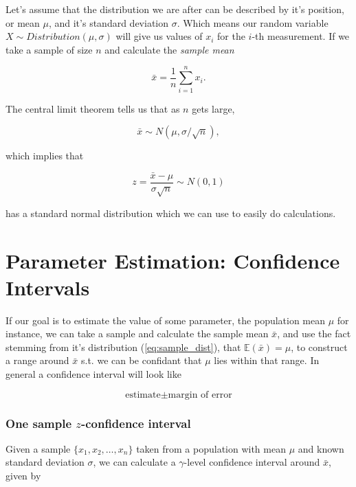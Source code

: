 \documentclass{article}
\newcommand{\xbar}{\bar x}
\begin{document}
Let's assume that the distribution we are after can be described by it's position, or mean $\mu$, and it's standard deviation $\sigma$.  Which means our random variable $X \sim Distribution(\mu, \sigma)$ will give us values of $x_i$ for the $i$-th measurement.  If we take a sample of size $n$ and calculate the \textit{sample mean}

\begin{equation}
\xbar = \frac{1}{n} \sum_{i=1}^n x_i.
\end{equation}

\noindent
The central limit theorem tells us that as $n$ gets large, 

\begin{equation}
\label{eq:sample_dist}
\xbar \sim N(\mu, \sigma / \sqrt{n}), 
\end{equation}


\noindent
which implies that

\begin{equation}
z = \frac{\xbar - \mu}{\sigma \sqrt{n}} \sim N(0,1)
\end{equation}

\noindent
has a standard normal distribution which we can use to easily do calculations.



\newpage
\section{Parameter Estimation: Confidence Intervals}

If our goal is to estimate the value of some parameter, the population mean $\mu$ for instance, we can take a sample and calculate the sample mean $\xbar$, and use the fact stemming from it's distribution (\ref{eq:sample_dist}), that $\mathbb{E}(\xbar) = \mu$, to construct a range around $\xbar$ s.t. we can be confidant that $\mu$ lies within that range. In general a confidence interval will look like

\begin{equation}
    \text{estimate} \pm \text{margin of error}
\end{equation}

\subsubsection*{One sample $z$-confidence interval}

Given a sample $\{x_1, x_2, \dots, x_n\}$ taken from a population with mean $\mu$ and known standard deviation $\sigma$, we can calculate a $\gamma$-level confidence interval around $\xbar$,  given by
\end{document}
